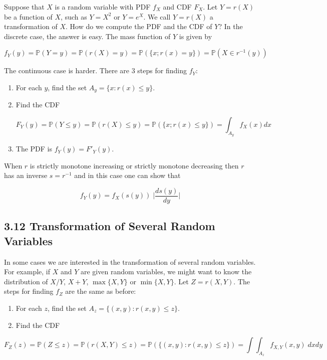 Suppose that \(X\) is a random variable with PDF \(f_X\) and CDF
\(F_X\). Let \(Y = r(X)\) be a function of \(X\), such as \(Y = X^2\) or
\(Y = e^X\). We call \(Y = r(X)\) a transformation of \(X\). How do we
compute the PDF and the CDF of \(Y\)? In the discrete case, the answer
is easy. The mass function of \(Y\) is given by

\[ f_Y(y) = \mathbb{P}(Y = y) = \mathbb{P}(r(X) = y) = \mathbb{P}(\{x; r(x) = y\}) = \mathbb{P}(X \in r^{-1}(y)) \]

The continuous case is harder. There are 3 steps for finding \(f_Y\):

\begin{enumerate}[label={\arabic*.}]
\item
  For each \(y\), find the set \(A_y = \{ x : r(x) \leq y \}\).
\item
  Find the CDF

  \[ F_Y(y) = \mathbb{P}(Y \leq y) = \mathbb{P}(r(X) \leq y) = \mathbb{P}(\{x ; r(x) \leq y \}) = \int_{A_y} f_X(x) dx \]
\item
  The PDF is \(f_Y(y) = F'_Y(y)\).
\end{enumerate}

When \(r\) is strictly monotone increasing or strictly monotone
decreasing then \(r\) has an inverse \(s = r^{-1}\) and in this case one
can show that

\[ f_Y(y) = f_X(s(y)) \;\Bigg| \frac{ds(y)}{dy} \Bigg|\]

\subsection{3.12 Transformation of Several Random
Variables}\label{transformation-of-several-random-variables}

In some cases we are interested in the transformation of several random
variables. For example, if \(X\) and \(Y\) are given random variables,
we might want to know the distribution of \(X / Y\), \(X + Y\),
\(\max \{ X, Y \}\) or \(\min \{ X, Y \}\). Let \(Z = r(X, Y)\). The
steps for finding \(f_Z\) are the same as before:

\begin{enumerate}[tightlist,label={\arabic*.}]
\item
  For each \(z\), find the set \(A_z = \{ (x, y) : r(x, y) \leq z \}\).
\item
  Find the CDF
\end{enumerate}

\[ F_Z(z) = \mathbb{P}(Z \leq z) = \mathbb{P}(r(X, Y) \leq z) = \mathbb{P}(\{ (x, y) : r(x, y) \leq z \})
  = \int \int_{A_z} f_{X, Y}(x, y) \; dx dy 
  \]

